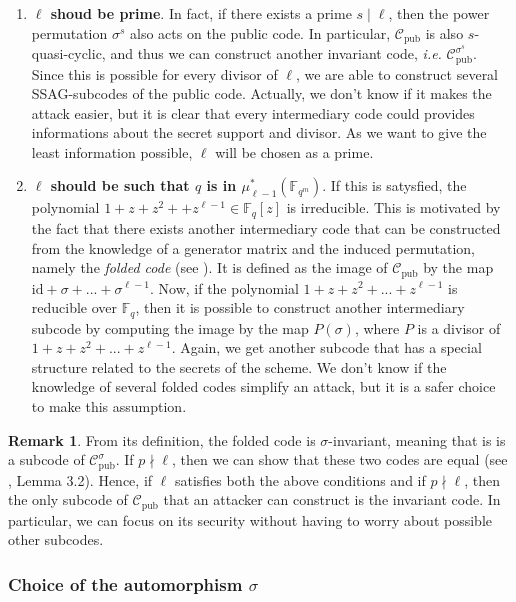 \documentclass[10pt]{article}
\theoremstyle{definition}
\newtheorem{rq1}[thm]{Remark}
\theoremstyle{definition}
\theoremstyle{definition}
\newcommand{\C}{\mathcal{C}}
\newcommand{\Fqm}{\mathbb{F}_{q^m}}
\newcommand{\Fq}{\mathbb{F}_q}
\begin{document}
\begin{enumerate}
\item \textbf{$\ell$ shoud be prime}. In fact, if there exists a prime $s \mid \ell$, then the power permutation $\sigma^s$ also acts on the public code. In particular, $\C_{\textrm{pub}}$ is also $s$-quasi-cyclic, and thus we can construct another invariant code, \textit{i.e.} $\C_{\textrm{pub}}^{\sigma^s}$. Since this is possible for every divisor of $\ell$, we are able to construct several SSAG-subcodes of the public code. Actually, we don't know if it makes the attack easier, but it is clear that every intermediary code could provides informations about the secret support and divisor. As we want to give the least information possible, $\ell$ will be chosen as a prime.

\item \textbf{$\ell$ should be such that $q$ is in $\mu_{\ell -1}^*(\Fqm)$}. If this is satysfied, the polynomial $1+z+z^2++z^{\ell-1} \in \Fq[z]$ is irreducible. This is motivated by the fact that there exists another intermediary code that can be constructed from the knowledge of a generator matrix and the induced permutation, namely the \textit{folded code} (see \cite{FOP}). It is defined as the image of $\C_{\textrm{pub}}$ by the map $\mathrm{id} +\sigma+...+\sigma^{\ell-1}$. Now, if the polynomial $1+z+z^2+...+z^{\ell-1}$ is reducible over $\Fq$, then it is possible to construct another intermediary subcode by computing the image by the map $P(\sigma)$, where $P$ is a divisor of $1+z+z^2+...+z^{\ell-1}$. Again, we get another subcode that has a special structure related to the secrets of the scheme. We don't know if the knowledge of several folded codes simplify an attack, but it is a safer choice to make this assumption.
\end{enumerate}

\begin{rq1} \label{un seul subcode} 
From its definition, the folded code is $\sigma$-invariant, meaning that is is a subcode of $\C_{\mathrm{pub}}^{\sigma}$. If $p \nmid \ell$, then we can show that these two codes are equal (see \cite{Bar1} , Lemma 3.2). Hence, if $\ell$ satisfies both the above conditions and if $p \nmid \ell$, then the only subcode of $\mathcal{C}_{\mathrm{pub}}$ that an attacker can construct is the invariant code. In particular, we can focus on its security without having to worry about possible other subcodes.  
\end{rq1}


\subsubsection{Choice of the automorphism $\sigma$} \label{choice_of_sigma}
\end{document}
